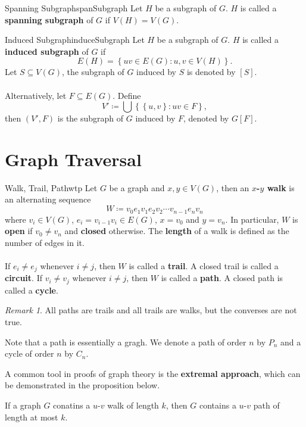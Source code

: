 \documentclass[math]{amznotes}
\theoremstyle{remark}
\newtheorem*{remark}{Remark}
\begin{document}
\begin{dfnbox}{Spanning Subgraph}{spanSubgraph}
    Let $H$ be a subgraph of $G$. $H$ is called a {\color{red} \textbf{spanning subgraph}} of $G$ if $V(H) = V(G)$.
\end{dfnbox}
\begin{dfnbox}{Induced Subgraph}{induceSubgraph}
    Let $H$ be a subgraph of $G$. $H$ is called a {\color{red} \textbf{induced subgraph}} of $G$ if
    \begin{equation*}
        E(H) = \left\{uv \in E(G) \colon u, v \in V(H)\right\}.
    \end{equation*}
    Let $S \subseteq V(G)$, the subgraph of $G$ induced by $S$ is denoted by $[S]$.
    \\\\
    Alternatively, let $F \subseteq E(G)$. Define
    \begin{equation*}
        V' \coloneqq \bigcup \left\{\left\{u, v\right\} \colon uv \in F\right\},
    \end{equation*}
    then $(V', F)$ is the subgraph of $G$ induced by $F$, denoted by $G[F]$.
\end{dfnbox}
\section{Graph Traversal}
\begin{dfnbox}{Walk, Trail, Path}{wtp}
    Let $G$ be a graph and $x, y \in V(G)$, then an {\color{red} \textbf{$x$-$y$ walk}} is an alternating sequence
    \begin{equation*}
        W \coloneqq v_0e_1v_1e_2v_2\cdots v_{n - 1}e_nv_n
    \end{equation*}
    where $v_i \in V(G)$, $e_i = v_{i - 1}v_i \in E(G)$, $x = v_0$ and $y = v_n$. In particular, $W$ is {\color{red} \textbf{open}} if $v_0 \neq v_n$ and {\color{red} \textbf{closed}} otherwise. The {\color{red} \textbf{length}} of a walk is defined as the number of edges in it.
    \\\\
    If $e_i \neq e_j$ whenever $i \neq j$, then $W$ is called a {\color{red} \textbf{trail}}. A closed trail is called a {\color{red} \textbf{circuit}}. If $v_i \neq v_j$ whenever $i \neq j$, then $W$ is called a {\color{red} \textbf{path}}. A closed path is called a {\color{red} \textbf{cycle}}.
\end{dfnbox}
\begin{notebox}
    \begin{remark}
        All paths are trails and all trails are walks, but the converses are not true.
    \end{remark}
\end{notebox}
Note that a path is essentially a gragh. We denote a path of order $n$ by $P_n$ and a cycle of order $n$ by $C_n$.

A common tool in proofs of graph theory is the \textbf{extremal approach}, which can be demonstrated in the proposition below.
\begin{probox}{}{}
    If a graph $G$ conatins a $u$-$v$ walk of length $k$, then $G$ contains a $u$-$v$ path of length at most $k$.
\end{probox}
\end{document}
